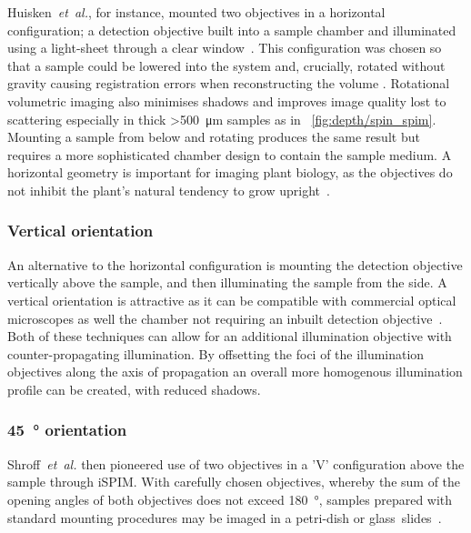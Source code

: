 Huisken~\emph{et~al.}, for instance, mounted two objectives in a horizontal configuration; a detection objective built into a sample chamber and illuminated using a \gls{light-sheet} through a clear window~\cite{huisken_optical_2004}.
This configuration was chosen so that a sample could be lowered into the system and, crucially, rotated without gravity causing registration errors when reconstructing the volume .%
Rotational volumetric imaging also minimises shadows and improves image quality lost to scattering especially in thick \SI{>500}{\micro\meter} samples as in \figurename~\ref{fig:depth/spin_spim}.
Mounting a sample from below and rotating produces the same result but requires a more sophisticated chamber design to contain the sample medium.
A horizontal geometry is important for imaging plant biology, as the objectives do not inhibit the plant's natural tendency to grow upright~\cite{wangenheimRulesSelfOrganizingProperties2016a}. %

\subsubsection{Vertical orientation}

An alternative to the horizontal configuration is mounting the detection objective vertically above the sample, and then illuminating the sample from the side.
A vertical orientation is attractive as it can be compatible with commercial optical microscopes as well the chamber not requiring an inbuilt detection objective~\cite{schlegel-zawadzkaFluorescenceImagingSpectroscopy1997,wuSpatiallyIsotropicFourdimensional2013}.
Both of these techniques can allow for an additional illumination objective with counter-propagating illumination.
By offsetting the foci of the illumination objectives along the axis of propagation an overall more homogenous illumination profile can be created, with reduced shadows.

\subsubsection{\SI{45}{\degree} orientation}

Shroff~\emph{et~al.} then pioneered use of two objectives in a 'V' configuration above the sample through \gls{iSPIM}.
With carefully chosen objectives, whereby the sum of the opening angles of both objectives does not exceed \SI{180}{\degree},
samples prepared with standard mounting procedures may be imaged in a petri-dish or glass~slides~\cite{kumarDualViewPlaneIllumination2014}.

